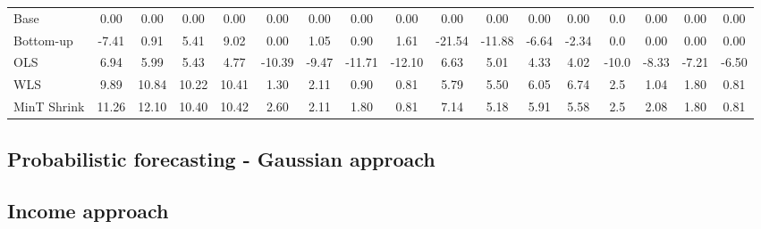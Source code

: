 \documentclass[graybox]{svmult}
\begin{document}
\begin{table}[H]
{\begin{tabular}{@{}lSSSSSSSSSSSSSSSS@{}}
			Base & 0.00 & 0.00 & 0.00 & 0.00 & 0.00 & 0.00 & 0.00 & 0.00 & 0.00 & 0.00 & 0.00 & 0.00 & 0.0 & 0.00 & 0.00 & 0.00\\
			
			Bottom-up & -7.41 & 0.91 & 5.41 & 9.02 & 0.00 & 1.05 & 0.90 & 1.61 & -21.54 & -11.88 & -6.64 & -2.34 & 0.0 & 0.00 & 0.00 & 0.00\\
			
			OLS & 6.94 & 5.99 & 5.43 & 4.77 & -10.39 & -9.47 & -11.71 & -12.10 & 6.63 & 5.01 & 4.33 & 4.02 & -10.0 & -8.33 & -7.21 & -6.50\\
			
			WLS & 9.89 & 10.84 & 10.22 & 10.41 & 1.30 & 2.11 & 0.90 & 0.81 & 5.79 & 5.50 & 6.05 & 6.74 & 2.5 & 1.04 & 1.80 & 0.81\\
			
			MinT Shrink & 11.26 & 12.10 & 10.40 & 10.42 & 2.60 & 2.11 & 1.80 & 0.81 & 7.14 & 5.18 & 5.91 & 5.58 & 2.5 & 2.08 & 1.80 & 0.81\\
			\bottomrule
		\end{tabular}
		\label{Tab: Exp_PointF}
	}
\end{table}


\subsection{Probabilistic forecasting - Gaussian approach}


\subsection*{Income approach}
\end{document}
